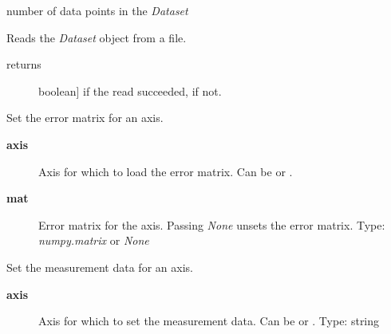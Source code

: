\documentclass[letterpaper,10pt,english]{sphinxmanual}
\begin{document}
\begin{fulllineitems}
\begin{fulllineitems}
\end{fulllineitems}


\begin{fulllineitems}
\label{api/kafe:kafe.dataset.Dataset.n_datapoints}
number of data points in the \emph{Dataset}

\end{fulllineitems}


\begin{fulllineitems}
\label{api/kafe:kafe.dataset.Dataset.read_from_file}
Reads the \emph{Dataset} object from a file.
\begin{description}
\item[{returns}] \leavevmode{[}boolean{]}
 if the read succeeded,  if not.

\end{description}

\end{fulllineitems}


\begin{fulllineitems}
\label{api/kafe:kafe.dataset.Dataset.set_cov_mat}
Set the error matrix for an axis.
\begin{description}
\item[{\textbf{axis}}] \leavevmode
Axis for which to load the error matrix. Can be  or .

\item[{\textbf{mat}}] \leavevmode
Error matrix for the axis. Passing \emph{None} unsets the error matrix. Type: \emph{numpy.matrix} or \emph{None}

\end{description}

\end{fulllineitems}


\begin{fulllineitems}
\label{api/kafe:kafe.dataset.Dataset.set_data}
Set the measurement data for an axis.
\begin{description}
\item[{\textbf{axis}}] \leavevmode
Axis for which to set the measurement data. Can be  or . Type: string


\end{description}
\end{fulllineitems}
\end{fulllineitems}
\end{document}
